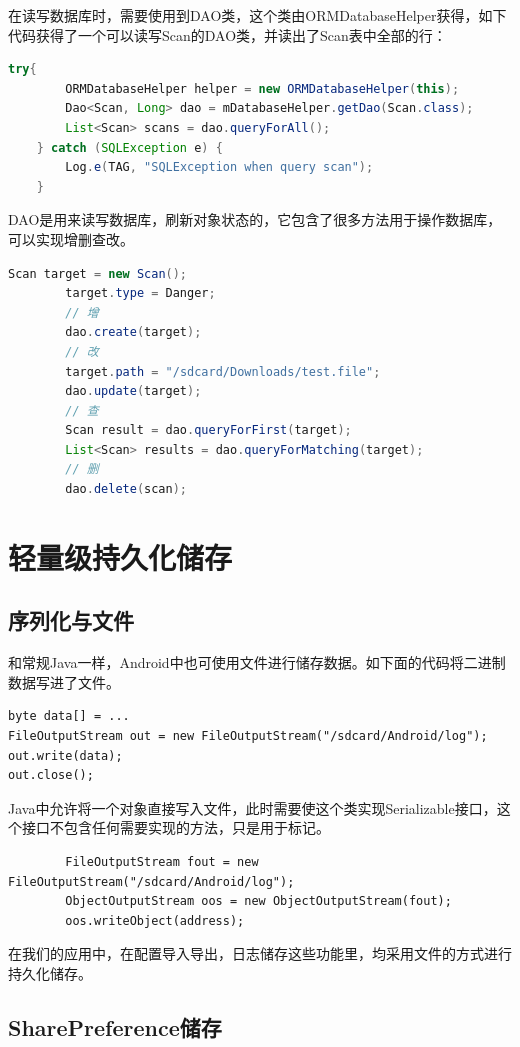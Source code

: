 \documentclass[format=final, language=chinese, degree=fyp]{hustthesis}
\begin{document}
	在读写数据库时，需要使用到DAO类，这个类由ORMDatabaseHelper获得，如下代码获得了一个可以读写Scan的DAO类，并读出了Scan表中全部的行：
	\begin{lstlisting}[language=java]
	try{
		ORMDatabaseHelper helper = new ORMDatabaseHelper(this);
		Dao<Scan, Long> dao = mDatabaseHelper.getDao(Scan.class);
		List<Scan> scans = dao.queryForAll();
	} catch (SQLException e) {
		Log.e(TAG, "SQLException when query scan");
	}
	\end{lstlisting}
	
	DAO是用来读写数据库，刷新对象状态的，它包含了很多方法用于操作数据库，可以实现增删查改。
	\begin{lstlisting}[language=java]
		Scan target = new Scan();
		target.type = Danger;
		// 增		
		dao.create(target);
		// 改
		target.path = "/sdcard/Downloads/test.file";
		dao.update(target);
		// 查
		Scan result = dao.queryForFirst(target);
		List<Scan> results = dao.queryForMatching(target);
		// 删
		dao.delete(scan);	
	\end{lstlisting}

\section{轻量级持久化储存}

\subsection{序列化与文件}

和常规Java一样，Android中也可使用文件进行储存数据。如下面的代码将二进制数据写进了文件。

\begin{lstlisting}
byte data[] = ...
FileOutputStream out = new FileOutputStream("/sdcard/Android/log");
out.write(data);
out.close();
\end{lstlisting}

Java中允许将一个对象直接写入文件，此时需要使这个类实现Serializable接口，这个接口不包含任何需要实现的方法，只是用于标记。

\begin{lstlisting}
		FileOutputStream fout = new FileOutputStream("/sdcard/Android/log");
		ObjectOutputStream oos = new ObjectOutputStream(fout);
		oos.writeObject(address);
\end{lstlisting}

在我们的应用中，在配置导入导出，日志储存这些功能里，均采用文件的方式进行持久化储存。


\subsection{SharePreference储存}
\end{document}
